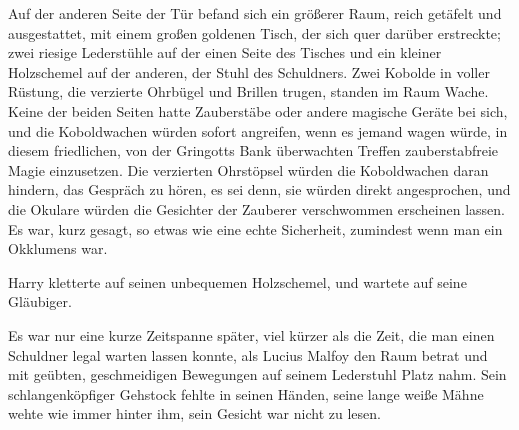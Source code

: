 Auf der anderen Seite der Tür befand sich ein größerer Raum, reich getäfelt und ausgestattet, mit einem großen goldenen Tisch, der sich quer darüber erstreckte; zwei riesige Lederstühle auf der einen Seite des Tisches und ein kleiner Holzschemel auf der anderen, der Stuhl des Schuldners. Zwei Kobolde in voller Rüstung, die verzierte Ohrbügel und Brillen trugen, standen im Raum Wache. Keine der beiden Seiten hatte Zauberstäbe oder andere magische Geräte bei sich, und die Koboldwachen würden sofort angreifen, wenn es jemand wagen würde, in diesem friedlichen, von der Gringotts Bank überwachten Treffen zauberstabfreie Magie einzusetzen. Die verzierten Ohrstöpsel würden die Koboldwachen daran hindern, das Gespräch zu hören, es sei denn, sie würden direkt angesprochen, und die Okulare würden die Gesichter der Zauberer verschwommen erscheinen lassen. Es war, kurz gesagt, so etwas wie eine echte Sicherheit, zumindest wenn man ein Okklumens war.

Harry kletterte auf seinen unbequemen Holzschemel, und wartete auf seine Gläubiger.

Es war nur eine kurze Zeitspanne später, viel kürzer als die Zeit, die man einen Schuldner legal warten lassen konnte, als Lucius Malfoy den Raum betrat und mit geübten, geschmeidigen Bewegungen auf seinem Lederstuhl Platz nahm. Sein schlangenköpfiger Gehstock fehlte in seinen Händen, seine lange weiße Mähne wehte wie immer hinter ihm, sein Gesicht war nicht zu lesen.

